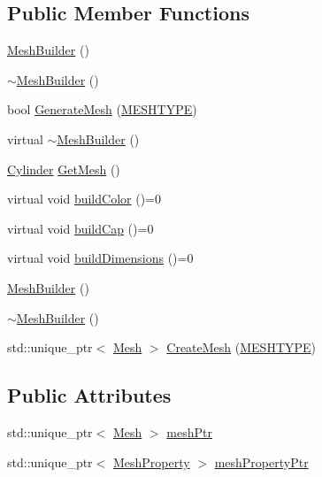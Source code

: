 \subsection*{Public Member Functions}
\begin{DoxyCompactItemize}
\item 
\mbox{\hyperlink{class_mesh_builder_a13fe22fd14a85f789dc9d7d4a8d2419d}{Mesh\+Builder}} ()
\item 
\mbox{\hyperlink{class_mesh_builder_ac409c889085089b34c5297cf7150f49d}{$\sim$\+Mesh\+Builder}} ()
\item 
bool \mbox{\hyperlink{class_mesh_builder_a9c48199d6ecab1f9c102e48d1b474f5a}{Generate\+Mesh}} (\mbox{\hyperlink{_abstract_factory_2_abstract_factory_2builder_2_mesh_builder_8h_ad6436347ddb93aed826a19081b53dd61}{M\+E\+S\+H\+T\+Y\+PE}})
\item 
virtual \mbox{\hyperlink{class_mesh_builder_a0ca7377cf981c1c2996f2f6dbc588352}{$\sim$\+Mesh\+Builder}} ()
\item 
\mbox{\hyperlink{class_cylinder}{Cylinder}} \mbox{\hyperlink{class_mesh_builder_a2db99e42ca33437243c6875a85417ef0}{Get\+Mesh}} ()
\item 
virtual void \mbox{\hyperlink{class_mesh_builder_a205a6daf8b50d88eebe1df434b7bf0c4}{build\+Color}} ()=0
\item 
virtual void \mbox{\hyperlink{class_mesh_builder_a5c69dabcf61fa1e87aa8b20fe2f54fe7}{build\+Cap}} ()=0
\item 
virtual void \mbox{\hyperlink{class_mesh_builder_af715a8510c99c7925bd8e6f0b6b182d7}{build\+Dimensions}} ()=0
\item 
\mbox{\hyperlink{class_mesh_builder_a13fe22fd14a85f789dc9d7d4a8d2419d}{Mesh\+Builder}} ()
\item 
\mbox{\hyperlink{class_mesh_builder_ac409c889085089b34c5297cf7150f49d}{$\sim$\+Mesh\+Builder}} ()
\item 
std\+::unique\+\_\+ptr$<$ \mbox{\hyperlink{class_mesh}{Mesh}} $>$ \mbox{\hyperlink{class_mesh_builder_a51d89fe601df06e63112c70416ac03dc}{Create\+Mesh}} (\mbox{\hyperlink{_abstract_factory_2_abstract_factory_2builder_2_mesh_builder_8h_ad6436347ddb93aed826a19081b53dd61}{M\+E\+S\+H\+T\+Y\+PE}})
\end{DoxyCompactItemize}
\subsection*{Public Attributes}
\begin{DoxyCompactItemize}
\item 
std\+::unique\+\_\+ptr$<$ \mbox{\hyperlink{class_mesh}{Mesh}} $>$ \mbox{\hyperlink{class_mesh_builder_ad15d79cf6c25b3381e4628f77adc099a}{mesh\+Ptr}}
\item 
std\+::unique\+\_\+ptr$<$ \mbox{\hyperlink{class_mesh_property}{Mesh\+Property}} $>$ \mbox{\hyperlink{class_mesh_builder_a0c1493d189b81576c0740cc9a9373dc1}{mesh\+Property\+Ptr}}
\end{DoxyCompactItemize}
